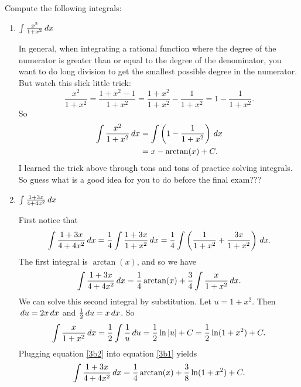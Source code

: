 \documentclass[nooutcomes]{ximera}
\begin{document}
\begin{problem}
Compute the following integrals:

	\begin{enumerate}
	
	\item  $\int \frac{x^2 }{1 + x^2} \,d x$
		\begin{freeResponse}
		In general, when integrating a rational function where the degree of the numerator is greater than or equal to the degree
		of the denominator, you want to do long division to get the smallest possible degree in the numerator.  
		But watch this slick little trick:
			\begin{equation*}
			\frac{x^2}{1+x^2} = \frac{1 + x^2 - 1}{1+x^2} = \frac{1+x^2}{1+x^2} - \frac{1}{1+x^2} = 1 - \frac{1}{1+x^2}.
			\end{equation*}
		So
			\begin{align*}
			\int \frac{x^2 }{1 + x^2} \,d x &= \int \left( 1 - \frac{1}{1+x^2} \right) \,d x  \\
			&= x - \arctan(x) + C.
			\end{align*}
		I learned the trick above through tons and tons of practice solving integrals.  
		So guess what is a good idea for you to do before the final exam???
		\end{freeResponse}
		
		
		
	\item  $ \int \frac{1+3x}{4+4x^2} \,d x$
		\begin{freeResponse}
		First notice that
			\begin{equation*}
			\int \frac{1+3x}{4+4x^2} \,d x = \frac{1}{4} \int \frac{1+3x}{1+x^2} \,d x = \frac{1}{4} \int \left( \frac{1}{1+x^2} + \frac{3x}{1+x^2} \right) \,d x.
			\end{equation*}
		The first integral is $\arctan(x)$, and so we have
			\begin{equation}\label{3b1}
			\int \frac{1+3x}{4+4x^2} \,d x = \frac{1}{4} \arctan(x) + \frac{3}{4} \int \frac{x}{1+x^2} \,d x.
			\end{equation}
		We can solve this second integral by substitution.  Let $u=1+x^2$.  Then $\,d u = 2x \,d x$ and $\frac{1}{2} \,d u = x \,d x$.  So
			\begin{equation}\label{3b2}
			\int \frac{x}{1+x^2} \,d x = \frac{1}{2} \int \frac{1}{u} \,d u = \frac{1}{2} \ln|u| +C = \frac{1}{2} \ln(1+x^2) + C.
			\end{equation}
		Plugging equation \eqref{3b2} into equation \eqref{3b1} yields
			\begin{equation*}
			\int \frac{1+3x}{4+4x^2} \,d x = \frac{1}{4} \arctan(x) + \frac{3}{8} \ln(1+x^2) + C.
			\end{equation*}
		\end{freeResponse}
		
		
		
	\end{enumerate}
			
			
		
\end{problem}
\end{document}
